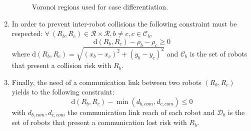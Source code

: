 \documentclass[eprint]{actapoly}
\begin{document}
\begin{enumerate}
\begin{figure}[!h]
{}
	\caption{Voronoi regions used for case differentiation. \label{fig:convexpolygon}}
	\end{figure}

    \item 
    In order to prevent inter-robot collisions the following constraint must be respected:
    $\forall\ (R_b, R_c) \in \mathcal{R} \times \mathcal{R}, b\neq c, c \in \mathcal{C}_b$,
    \begin{equation}\label{eq:coll}
	    \mathrm{d}(R_b,R_c) - \rho_b -\rho_c \geq 0
    \end{equation}
    where $\mathrm{d}(R_b,R_c) = \sqrt{(x_{b} - x_{c})^2 + (y_{b} - y_{c})^2}$ and
    $\mathcal{C}_b$ is the set of robots that present a collision risk with
    $R_b$.
    
    \item Finally, the need of a communication link between two robots $(R_b, R_c)$ yields to
    the following constraint:
    \begin{equation}\label{eq:com}
    	\mathrm{d}(R_b,R_c)  - \min(d_{b,com}, d_{c,com}) \leq 0
    \end{equation}
    with $d_{b,com}, d_{c,com}$ the communication link reach of each robot and
    $\mathcal{D}_b$ is the set of robots that present a communication lost risk with
    $R_b$.
\end{enumerate}
\end{document}
